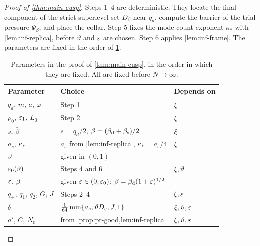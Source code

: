 \begin{proof}[Proof of \cref{thm:main-cusp}]
Steps 1--4 are deterministic. They locate the final component of the strict superlevel set $D_\beta$ near $q_d$, compute the barrier of the trial pressure $\Psi_\beta$, and place the collar. Step 5 fixes the mode-count exponent $\kappa_*$ with \cref{lem:inf-replica}, before $\vartheta$ and $\varepsilon$ are chosen. Step 6 applies \cref{lem:inf-frame}. The parameters are fixed in the order of \cref{tab:inf-cusp}.

\begin{table}[ht]
\centering\small
\begin{tabular}{@{}lll@{}}
\toprule
Parameter & Choice & Depends on\\
\midrule
$q_d$, $m$, $a$, $\varphi$ & Step 1 & $\xi$\\
$\rho_0$, $\varepsilon_1$, $L_0$ & Step 2 & $\xi$\\
$s$, $\bar\beta$ & $s=q_d/2$, $\bar\beta=(\beta_{\mathrm d}+\beta_{\mathrm s})/2$ & $\xi$\\
$a_s$, $\kappa_*$ & $a_s$ from \cref{lem:inf-replica}, $\kappa_*=a_s/4$ & $\xi$\\
$\vartheta$ & given in $(0,1)$ & ---\\
$\varepsilon_0(\vartheta)$ & Steps 4 and 6 & $\xi,\vartheta$\\
$\varepsilon$, $\beta$ & given $\varepsilon\in(0,\varepsilon_0)$; $\beta=\beta_{\mathrm d}(1+\varepsilon)^{1/2}$ & ---\\
$q_\pm$, $q_1$, $q_2$, $G$, $J$ & Steps 2--4 & $\xi,\varepsilon$\\
$\delta$ & $\frac1{64}\min\{a_s,\vartheta D_\varepsilon,J,1\}$ & $\xi,\vartheta,\varepsilon$\\
$a'$, $C$, $N_0$ & from \cref{prop:pr-good,lem:inf-replica} & $\xi,\vartheta,\varepsilon$\\
\bottomrule
\end{tabular}
\caption{Parameters in the proof of \cref{thm:main-cusp}, in the order in which they are fixed. All are fixed before $N\to\infty$.}\label{tab:inf-cusp}
\end{table}


\end{proof}
